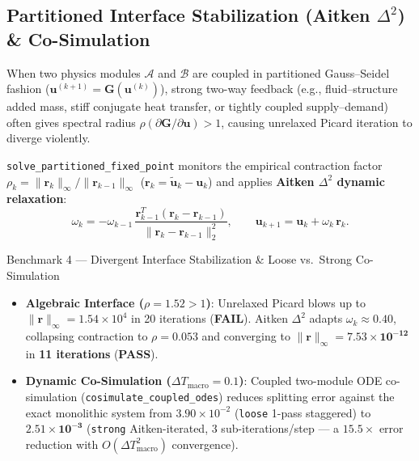 \documentclass[11pt,a4paper]{article}
\begin{document}
\subsection{Partitioned Interface Stabilization (Aitken $\Delta^2$) \& Co-Simulation}
When two physics modules $\mathcal{A}$ and $\mathcal{B}$ are coupled in partitioned Gauss--Seidel fashion ($\mathbf{u}^{(k+1)} = \mathbf{G}(\mathbf{u}^{(k)})$), strong two-way feedback (e.g., fluid--structure added mass, stiff conjugate heat transfer, or tightly coupled supply--demand) often gives spectral radius $\rho(\partial\mathbf{G}/\partial\mathbf{u}) > 1$, causing unrelaxed Picard iteration to diverge violently.

\texttt{solve\_partitioned\_fixed\_point} monitors the empirical contraction factor $\rho_k = \|\mathbf{r}_k\|_\infty / \|\mathbf{r}_{k-1}\|_\infty$ ($\mathbf{r}_k = \tilde{\mathbf{u}}_k - \mathbf{u}_k$) and applies \textbf{Aitken $\Delta^2$ dynamic relaxation}:
\begin{equation}
  \omega_k = -\omega_{k-1}\,\frac{\mathbf{r}_{k-1}^T(\mathbf{r}_k - \mathbf{r}_{k-1})}{\|\mathbf{r}_k - \mathbf{r}_{k-1}\|_2^2},
  \qquad
  \mathbf{u}_{k+1} = \mathbf{u}_k + \omega_k\,\mathbf{r}_k.
\end{equation}

\begin{resultbox}{Benchmark 4 — Divergent Interface Stabilization \& Loose vs.\ Strong Co-Simulation}
\begin{itemize}[leftmargin=1.4em,itemsep=2pt]
  \item \textbf{Algebraic Interface ($\rho = 1.52 > 1$)}: Unrelaxed Picard blows up to $\|\mathbf{r}\|_\infty = 1.54\times 10^4$ in 20 iterations (\textbf{FAIL}). Aitken $\Delta^2$ adapts $\omega_k \approx 0.40$, collapsing contraction to $\rho = \mathbf{0.053}$ and converging to $\|\mathbf{r}\|_\infty = \mathbf{7.53\times 10^{-12}}$ in \textbf{11 iterations} (\textbf{PASS}).
  \item \textbf{Dynamic Co-Simulation ($\Delta T_{\text{macro}} = 0.1$)}: Coupled two-module ODE co-simulation (\texttt{cosimulate\_coupled\_odes}) reduces splitting error against the exact monolithic system from $3.90\times 10^{-2}$ (\texttt{loose} 1-pass staggered) to $\mathbf{2.51\times 10^{-3}}$ (\texttt{strong} Aitken-iterated, $3$ sub-iterations/step — a $\mathbf{15.5\times}$ error reduction with $O(\Delta T_{\text{macro}}^2)$ convergence).
\end{itemize}
\end{resultbox}
\end{document}
